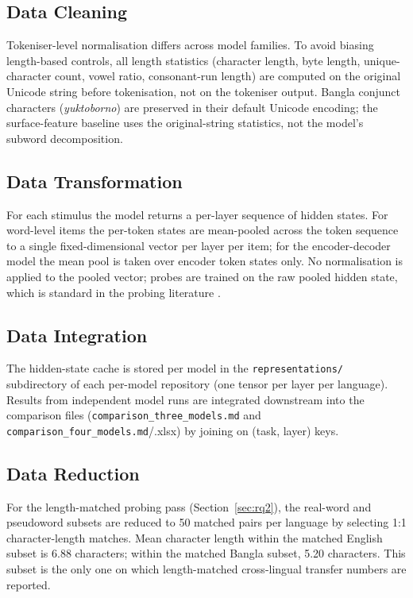 \subsection{Data Cleaning}

Tokeniser-level normalisation differs across model families. To avoid biasing length-based controls, all length statistics (character length, byte length, unique-character count, vowel ratio, consonant-run length) are computed on the original Unicode string before tokenisation, not on the tokeniser output. Bangla conjunct characters (\textit{yuktoborno}) are preserved in their default Unicode encoding; the surface-feature baseline uses the original-string statistics, not the model's subword decomposition.

\subsection{Data Transformation}

For each stimulus the model returns a per-layer sequence of hidden states. For word-level items the per-token states are mean-pooled across the token sequence to a single fixed-dimensional vector per layer per item; for the encoder-decoder model the mean pool is taken over encoder token states only. No normalisation is applied to the pooled vector; probes are trained on the raw pooled hidden state, which is standard in the probing literature \cite{conneau2018probing}.

\subsection{Data Integration}

The hidden-state cache is stored per model in the \texttt{representations/} subdirectory of each per-model repository (one tensor per layer per language). Results from independent model runs are integrated downstream into the comparison files (\texttt{comparison\_three\_models.md} and \texttt{comparison\_four\_models.md}/.xlsx) by joining on (task, layer) keys.

\subsection{Data Reduction}

For the length-matched probing pass (Section~\ref{sec:rq2}), the real-word and pseudoword subsets are reduced to 50 matched pairs per language by selecting 1:1 character-length matches. Mean character length within the matched English subset is 6.88 characters; within the matched Bangla subset, 5.20 characters. This subset is the only one on which length-matched cross-lingual transfer numbers are reported.

